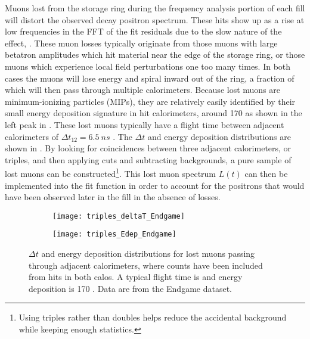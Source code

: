 Muons lost from the storage ring during the frequency analysis portion of each fill will distort the observed decay positron spectrum. These hits show up as a rise at low frequencies in the FFT of the fit residuals due to the slow nature of the effect, . These muon losses typically originate from those muons with large betatron amplitudes which hit material near the edge of the storage ring, or those muons which experience local field perturbations one too many times. In both cases the muons will lose energy and spiral inward out of the ring, a fraction of which will then pass through multiple calorimeters. Because lost muons are minimum-ionizing particles (MIPs), they are relatively easily identified by their small energy deposition signature in hit calorimeters, around 170 \MeV as shown in the left peak in . These lost muons typically have a flight time between adjacent calorimeters of $\Delta t_{12} = \SI{6.5}{ns}$ \cite{lostmuonspaper,lostmuonsDenverTalk}. The $\Delta t$ and energy deposition distributions are shown in . By looking for coincidences between three adjacent calorimeters, or triples, and then applying cuts and subtracting backgrounds, a pure sample of lost muons can be constructed\footnote{Using triples rather than doubles helps reduce the accidental background while keeping enough statistics.}. This lost muon spectrum $L(t)$ can then be implemented into the fit function in order to account for the positrons that would have been observed later in the fill in the absence of losses.

\begin{figure}
\centering
    \begin{subfigure}[]{0.48\textwidth}
        \centering
        \texttt{[image: triples\_deltaT\_Endgame]}
        \caption{}
    \end{subfigure}%
    \begin{subfigure}[]{0.48\textwidth}
        \centering
        \texttt{[image: triples\_Edep\_Endgame]}
        \caption{}
    \end{subfigure}
\caption[Lost muon $\Delta t$ and energy deposition distributions]{$\Delta t$ and energy deposition distributions for lost muons passing through adjacent calorimeters, where counts have been included from hits in both calos. A typical flight time is  and energy deposition is 170 \MeV. Data are from the Endgame dataset.}
\label{fig:lostmuondistributions}
\end{figure}


